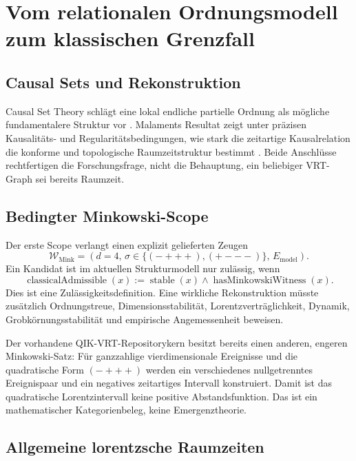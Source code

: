 \documentclass[11pt,a4paper]{article}
\begin{document}
\section{Vom relationalen Ordnungsmodell zum klassischen Grenzfall}

\subsection{Causal Sets und Rekonstruktion}

Causal Set Theory schlägt eine lokal endliche partielle Ordnung als mögliche
fundamentalere Struktur vor \cite{Bombelli1987}. Malaments Resultat zeigt unter
präzisen Kausalitäts- und Regularitätsbedingungen, wie stark die zeitartige
Kausalrelation die konforme und topologische Raumzeitstruktur bestimmt
\cite{Malament1977}. Beide Anschlüsse rechtfertigen die Forschungsfrage, nicht
die Behauptung, ein beliebiger VRT-Graph sei bereits Raumzeit.

\subsection{Bedingter Minkowski-Scope}

Der erste Scope verlangt einen explizit gelieferten Zeugen
\begin{equation}
  \mathcal{W}_{\mathrm{Mink}}=
  (d=4,\,\sigma\in\{(-+++),(+---)\},\,E_{\mathrm{model}}).
\end{equation}
Ein Kandidat ist im aktuellen Strukturmodell nur zulässig, wenn
\begin{equation}
  \operatorname{classicalAdmissible}(x)
  :=\operatorname{stable}(x)
    \land \operatorname{hasMinkowskiWitness}(x).
\end{equation}
Dies ist eine Zulässigkeitsdefinition. Eine wirkliche Rekonstruktion müsste
zusätzlich Ordnungstreue, Dimensionsstabilität, Lorentzverträglichkeit,
Dynamik, Grobkörnungsstabilität und empirische Angemessenheit beweisen.

Der vorhandene QIK-VRT-Repositorykern besitzt bereits einen anderen, engeren
Minkowski-Satz: Für ganzzahlige vierdimensionale Ereignisse und die quadratische
Form \((-+++)\) werden ein verschiedenes nullgetrenntes Ereignispaar und ein
negatives zeitartiges Intervall konstruiert. Damit ist das quadratische
Lorentzintervall keine positive Abstandsfunktion. Das ist ein mathematischer
Kategorienbeleg, keine Emergenztheorie.

\subsection{Allgemeine lorentzsche Raumzeiten}
\end{document}
